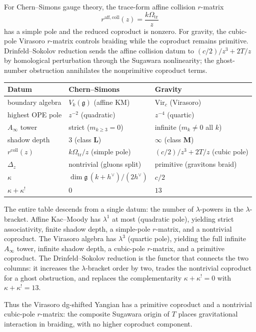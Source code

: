 \documentclass[11pt]{article}
\theoremstyle{plain}
\theoremstyle{definition}
\theoremstyle{remark}
\begin{document}
For Chern--Simons gauge theory, the trace-form affine collision
$r$-matrix
\[
r^{\mathrm{aff,coll}}(z)=\frac{k\Omega_{\mathrm{tr}}}{z}
\]
has a simple pole and the reduced coproduct is nonzero. For gravity,
the cubic-pole Virasoro $r$-matrix controls braiding while the
coproduct remains primitive. Drinfeld--Sokolov reduction sends the
affine collision datum to $(c/2)/z^3+2T/z$ by homological perturbation
through the Sugawara nonlinearity; the ghost-number obstruction
annihilates the nonprimitive coproduct terms.

\begin{center}
\small
\renewcommand{\arraystretch}{1.15}
\begin{tabular}{lll}
\textbf{Datum} & \textbf{Chern--Simons} & \textbf{Gravity} \\
\hline
boundary algebra
 & $V_k(\mathfrak{g})$ (affine KM)
 & $\mathrm{Vir}_c$ (Virasoro) \\[2pt]
highest OPE pole
 & $z^{-2}$ (quadratic)
 & $z^{-4}$ (quartic) \\[2pt]
$A_\infty$ tower
 & strict ($m_{k \geq 3} = 0$)
 & infinite ($m_k \neq 0$ all $k$) \\[2pt]
shadow depth
 & $3$ (class $\mathbf{L}$)
 & $\infty$ (class $\mathbf{M}$) \\[2pt]
$r^{\mathrm{coll}}(z)$
 & $k\Omega_{\mathrm{tr}}/z$ (simple pole)
 & $(c/2)/z^3 + 2T/z$ (cubic pole) \\[2pt]
$\Delta_z$
 & nontrivial (gluons split)
 & primitive (gravitons braid) \\[2pt]
$\kappa$
 & $\dim\mathfrak{g}\,(k+h^\vee)/(2h^\vee)$
 & $c/2$ \\[2pt]
$\kappa + \kappa^!$
 & $0$
 & $13$
\end{tabular}
\end{center}

The entire table descends from a single datum: the number of
$\lambda$-powers in the $\lambda$-bracket. Affine Kac--Moody has
$\lambda^1$ at most (quadratic pole), yielding strict associativity,
finite shadow depth, a simple-pole $r$-matrix, and a nontrivial
coproduct. The Virasoro algebra has $\lambda^3$ (quartic pole),
yielding the full infinite $A_\infty$ tower, infinite shadow depth,
a cubic-pole $r$-matrix, and a primitive coproduct. The
Drinfeld--Sokolov reduction is the functor that connects the two
columns: it increases the $\lambda$-bracket order by two, trades
the nontrivial coproduct for a ghost obstruction, and replaces the
complementarity $\kappa + \kappa^! = 0$ with $\kappa + \kappa^! = 13$.

\smallskip

Thus the Virasoro dg-shifted Yangian has a primitive coproduct and a
nontrivial cubic-pole $r$-matrix: the composite Sugawara origin of
$T$ places gravitational interaction in braiding, with no higher
coproduct component.

\ifdefined\shadowtowervtwoincluded
\else
\end{document}
